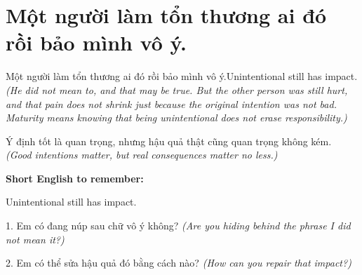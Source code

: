 \section{Một người làm tổn thương ai đó rồi bảo mình vô ý.}
\begin{truyen}{Một người làm tổn thương ai đó rồi bảo mình vô ý.}{Unintentional still has impact.}
\textit{(He did not mean to, and that may be true. But the other person was still hurt, and that pain does not shrink just because the original intention was not bad. Maturity means knowing that being unintentional does not erase responsibility.)}
\end{truyen}
\begin{baihoc}
Ý định tốt là quan trọng, nhưng hậu quả thật cũng quan trọng không kém.
\textit{(Good intentions matter, but real consequences matter no less.)}
\end{baihoc}
\begin{ghinhoanh}\textbf{Short English to remember:}

Unintentional still has impact.
\end{ghinhoanh}
\begin{tuhocnhanh}
1. Em có đang núp sau chữ vô ý không? \textit{(Are you hiding behind the phrase I did not mean it?)}

2. Em có thể sửa hậu quả đó bằng cách nào? \textit{(How can you repair that impact?)}
\end{tuhocnhanh}
\ngancach

